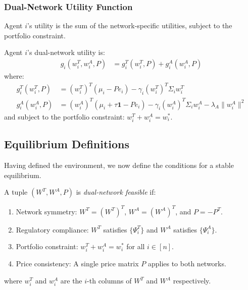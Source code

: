 \subsubsection{Dual-Network Utility Function}

Agent $i$'s utility is the sum of the network-specific utilities, subject to the portfolio constraint.

\begin{definition}
\label{def:dual_utility}
Agent $i$'s dual-network utility is:
\begin{align}
g_i(w_i^T, w_i^A, P) &= g_i^T(w_i^T, P) + g_i^A(w_i^A, P) \label{eq:dual_utility_total}
\end{align}
where:
\begin{align}
g_i^T(w_i^T, P) &= (w_i^T)^T(\mu_i - Pe_i) - \gamma_i(w_i^T)^T\Sigma_i w_i^T \label{eq:utility_traditional} \\
g_i^A(w_i^A, P) &= (w_i^A)^T(\mu_i + \tau \mathbf{1} - Pe_i) - \gamma_i(w_i^A)^T\Sigma_i w_i^A - \lambda_A\|w_i^A\|^2 \label{eq:utility_alternative}
\end{align}
and subject to the portfolio constraint: $w_i^T + w_i^A = w_i^*$.
\end{definition}


\subsection{Equilibrium Definitions}
\label{sec:equilibrium_defs}

Having defined the environment, we now define the conditions for a stable equilibrium.

\begin{definition}
\label{def:dual_feasible}
A tuple $(W^T, W^A, P)$ is \textit{dual-network feasible} if:
\begin{enumerate}
    \item Network symmetry: $W^T = (W^T)^T$, $W^A = (W^A)^T$, and $P = -P^T$.
    \item Regulatory compliance: $W^T$ satisfies $\{\Psi_i^T\}$ and $W^A$ satisfies $\{\Psi_i^A\}$.
    \item Portfolio constraint: $w_i^T + w_i^A = w_i^*$ for all $i \in [n]$.
    \item Price consistency: A single price matrix $P$ applies to both networks.
\end{enumerate}
where $w_i^T$ and $w_i^A$ are the $i$-th columns of  $W^T$ and  $W^A$ respectively.
\end{definition}


